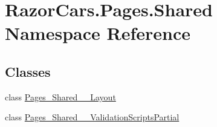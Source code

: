 \hypertarget{namespace_razor_cars_1_1_pages_1_1_shared}{}\section{Razor\+Cars.\+Pages.\+Shared Namespace Reference}
\label{namespace_razor_cars_1_1_pages_1_1_shared}
\subsection*{Classes}
\begin{DoxyCompactItemize}
\item 
class \mbox{\hyperlink{class_razor_cars_1_1_pages_1_1_shared_1_1_pages___shared_____layout}{Pages\+\_\+\+Shared\+\_\+\+\_\+\+Layout}}
\item 
class \mbox{\hyperlink{class_razor_cars_1_1_pages_1_1_shared_1_1_pages___shared_____validation_scripts_partial}{Pages\+\_\+\+Shared\+\_\+\+\_\+\+Validation\+Scripts\+Partial}}
\end{DoxyCompactItemize}
